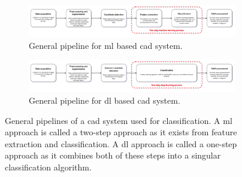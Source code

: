 \begin{figure}[ht]
  \begin{minipage}{\textwidth}
    \centering
    \begin{subfigure}{0.95\textwidth}
        \centering
        \includegraphics[width=\textwidth]{../images/introduction/cad_pipeline_ml.pdf}
        \captionsetup{width=0.9\linewidth}
        \captionsetup{justification=centering}
        \caption{General pipeline for \gls{ml} based \gls{cad} system.}
        \label{fig:cad_pipeline_ml}
    \end{subfigure}
    \hfill
    \begin{subfigure}{.95\textwidth}
        \centering
        \includegraphics[width=\textwidth]{../images/introduction/cad_pipeline_dl.pdf}
        \captionsetup{width=0.9\linewidth}
        \captionsetup{justification=centering}
        \caption{General pipeline for \gls{dl} based \gls{cad} system.}
        \label{fig:cad_pipeline_dl}
    \end{subfigure}
    \captionsetup{width=0.9\linewidth}
    \captionsetup{justification=centering}
    \caption{General pipelines of a \gls{cad} system used for classification. A \gls{ml} approach is called a two-step approach as it exists from feature extraction and classification. A \gls{dl} approach is called a one-step approach as it combines both of these steps into a singular classification algorithm.}
    \label{fig:cad_pipeline}
  \end{minipage}  
\end{figure}

